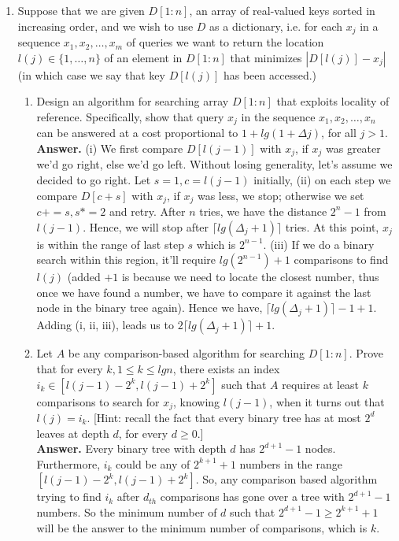 \documentclass[letterpaper,12pt]{article}
\begin{document}
\begin{enumerate}
\item Suppose that we are given $D[1 : n]$, an array of real-valued keys sorted in increasing order, and we wish to use $D$ as a dictionary, i.e. for each $x_j$ in a sequence $x_1, x_2, \ldots , x_m$ of queries we want to return the location $l(j) \in \{1,\ldots,n\}$ of an element in $D[1 : n]$ that minimizes $|D[l(j)] - x_j|$ (in which case we say that key $D[l(j)]$ has been accessed.)

	\begin{enumerate}
		\item Design an algorithm for searching array $D[1 : n]$ that exploits locality of reference. Specifically, show that query $x_j$ in the sequence $x_1, x_2, \ldots , x_n$ can be answered at a cost proportional to $1 + lg(1 + \Delta{}j )$, for all $j > 1$.\\
		\textbf{Answer.} (i) We first compare $D[l(j-1)]$ with $x_j$, if $x_j$ was greater we'd go right, else we'd go left. Without losing generality, let's assume we decided to go right. Let $s=1, c=l(j-1)$ initially, (ii) on each step we compare $D[c+s]$ with $x_j$, if $x_j$ was less, we stop; otherwise we set $c+=s, s*=2$ and retry. After $n$ tries, we have the distance $2^n-1$ from $l(j-1)$. Hence, we will stop after $\lceil lg(\Delta_j+1) \rceil$ tries. At this point, $x_j$ is within the range of last step $s$ which is $2^{n-1}$. (iii) If we do a binary search within this region, it'll require $lg(2^{n-1})+1$ comparisons to find $l(j)$ (added $+1$ is because we need to locate the closest number, thus once we have found a number, we have to compare it against the last node in the binary tree again). Hence we have, $\lceil lg(\Delta_j+1) \rceil -1 +1$. Adding (i, ii, iii), leads us to $2\lceil lg(\Delta_j+1) \rceil+1$.

\item Let $A$ be any comparison-based algorithm for searching $D[1 : n]$. Prove that for every $k, 1 \leq k \leq lgn$, there exists an index $i_k \in [l(j -1)-2^k, l(j -1)+2^k]$ such that $A$ requires at least $k$ comparisons to search for $x_j$, knowing $l(j - 1)$, when it turns out that $l(j) = i_k$. [Hint: recall the fact that every binary tree has at most $2^d$ leaves at depth $d$, for every $d \geq 0$.]\\
	\textbf{Answer.} Every binary tree with depth $d$ has $2^{d+1}-1$ nodes. Furthermore, $i_k$ could be any of $2^{k+1}+1$ numbers in the range $[l(j -1)-2^k, l(j -1)+2^k]$. So, any comparison based algorithm trying to find $i_k$ after $d_{th}$ comparisons has gone over a tree with $2^{d+1}-1$ numbers. So the minimum number of $d$ such that $2^{d+1}-1\geq2^{k+1} +1$ will be the answer to the minimum number of comparisons, which is $k$.
	\end{enumerate}


\end{enumerate}
\end{document}
